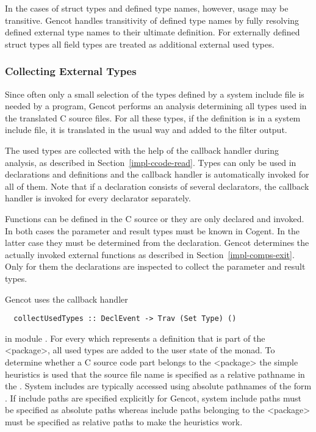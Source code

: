 In the cases of struct types and defined type names, however, usage may be transitive. Gencot handles transitivity
of defined type names by fully resolving defined external type names to their ultimate definition. For externally
defined struct types all field types are treated as additional external used types. 

\subsubsection{Collecting External Types}

Since often only a small selection of the types defined by a system include file is needed by a program, Gencot performs 
an analysis determining all types used in the translated C source files. For all these types, if the definition is in a 
system include file, it is translated in the usual way and added to the filter output.

The used types are collected with the help of the callback handler during analysis, as described in 
Section~\ref{impl-ccode-read}. Types can only be used in declarations and definitions and the callback handler is
automatically invoked for all of them. Note that if a declaration consists of several declarators, the callback
handler is invoked for every declarator separately. 

Functions can be defined in the C source or they are only declared and invoked. In both cases the parameter and result
types must be known in Cogent. In the latter case they must be determined from the declaration. Gencot determines the
actually invoked external functions as described in Section~\ref{impl-comps-exit}. Only for them the declarations 
are inspected to collect the parameter and result types.

Gencot uses the callback handler
\begin{verbatim}
  collectUsedTypes :: DeclEvent -> Trav (Set Type) ()
\end{verbatim}
in module . For every  which represents a definition that is
part of the <package>, all used types are added to the user state of the  monad. To determine whether
a C source code part belongs to the <package> the simple heuristics is used that the source file name is specified
as a relative pathname in the . System includes are typically accessed using absolute pathnames of the 
form . If include paths are specified explicitly for Gencot, system include paths must be 
specified as absolute paths whereas include paths belonging to the <package> must be specified as relative paths
to make the heuristics work.


